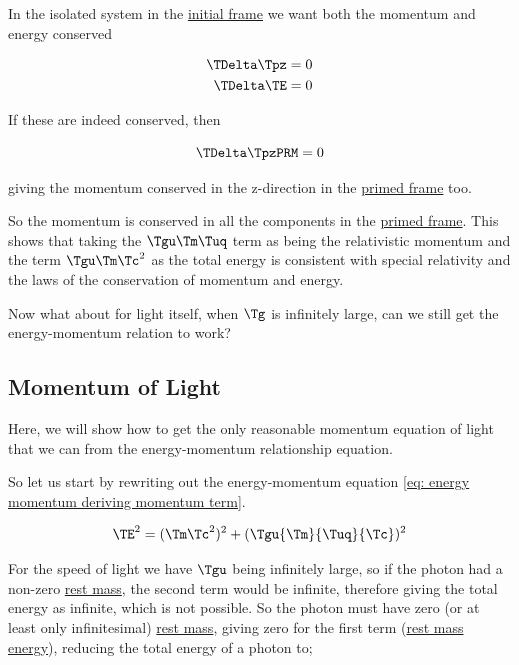 \begin{derivation}
In the isolated system in the \hyperlink{def-initial-Frame}{initial frame} we want both the momentum and energy conserved

\begin{equation}
	\begin{aligned}
		\TDelta  \Tpz  & =0 \\
		\TDelta  \TE  & =0
	\end{aligned}
\end{equation}

If these are indeed conserved, then

\begin{equation}
	\TDelta  \TpzPRM  = 0
\end{equation}

giving the momentum conserved in the z-direction in the \hyperlink{def-Primed-Frame}{primed frame} too.

\end{derivation}

So the momentum is conserved in all the components in the \hyperlink{def-Primed-Frame}{primed frame}.
This shows that taking the $\Tgu  \Tm  \Tuq $ term as being the relativistic momentum and the term $\Tgu  \Tm  \Tc ^2$ as the total energy is consistent with special relativity and the laws of the conservation of momentum and energy.

Now what about for light itself, when $\Tg $ is infinitely large, can we still get the energy-momentum relation to work?

\subsection{Momentum of Light}\label{subsect: Momentum of Light}

Here, we will show how to get the only reasonable momentum equation of light that we can from the energy-momentum relationship equation.

So let us start by rewriting out the energy-momentum equation \eqref{eq: energy momentum deriving momentum term}.

\begin{equation}
		\TE ^2 = (\Tm \Tc ^2)^2 + (\Tgu {\Tm }{\Tuq }{\Tc })^2
\end{equation}

For the speed of light we have $\Tgu $ being infinitely large, so if the photon had a non-zero \hyperlink{def-rest-mass}{rest mass}, the second term would be infinite, therefore giving the total energy as infinite, which is not possible.
So the photon must have zero (or at least only infinitesimal) \hyperlink{def-rest-mass}{rest mass}, giving zero for the first term (\hyperlink{def-rest-mass-energy}{rest mass energy}), reducing the total energy of a photon to;

